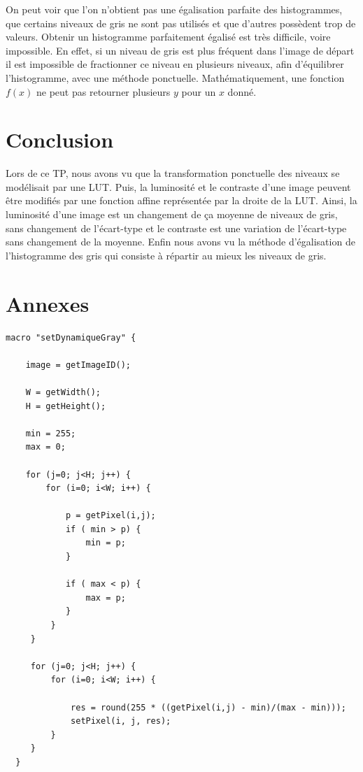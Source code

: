 \documentclass[a4paper,11pt]{article}
\begin{document}
  \newpage
  
  On peut voir que l'on n'obtient pas une égalisation parfaite des histogrammes,
  que certains niveaux de gris ne sont pas utilisés et que d'autres possèdent trop 
  de valeurs. Obtenir un histogramme parfaitement égalisé est très difficile, voire 
  impossible. En effet, si un niveau de gris est plus fréquent dans l'image de départ 
  il est impossible de fractionner ce niveau en plusieurs niveaux, afin d'équilibrer 
  l'histogramme, avec une méthode ponctuelle. Mathématiquement, une fonction $f(x)$ 
  ne peut pas retourner plusieurs $y$ pour un $x$ donné.\\
  
  \section*{Conclusion}
  Lors de ce TP, nous avons vu que la transformation ponctuelle des niveaux se modélisait 
  par une LUT. Puis, la luminosité et le contraste d'une image peuvent être modifiés par 
  une fonction affine représentée par la droite de la LUT. Ainsi, la luminosité d'une 
  image est un changement de ça moyenne de niveaux de gris, sans changement de l'écart-type 
  et le contraste est une variation de l'écart-type sans changement de la moyenne. Enfin 
  nous avons vu la méthode d'égalisation de l'histogramme des gris qui consiste à répartir
  au mieux les niveaux de gris.
  \newpage
  
  \section*{Annexes}
  \begin{lstlisting}[caption=Macro d'extension d'histogramme]
  macro "setDynamiqueGray" {

    image = getImageID();

    W = getWidth();
    H = getHeight();

    min = 255;
    max = 0;

    for (j=0; j<H; j++) {
        for (i=0; i<W; i++) {

            p = getPixel(i,j);
            if ( min > p) {
                min = p;
            }

            if ( max < p) {
                max = p;
            }
         }
     }

     for (j=0; j<H; j++) {
         for (i=0; i<W; i++) {

             res = round(255 * ((getPixel(i,j) - min)/(max - min)));
             setPixel(i, j, res);
         }
     }
  }
  \end{lstlisting}
  
\end{document}

